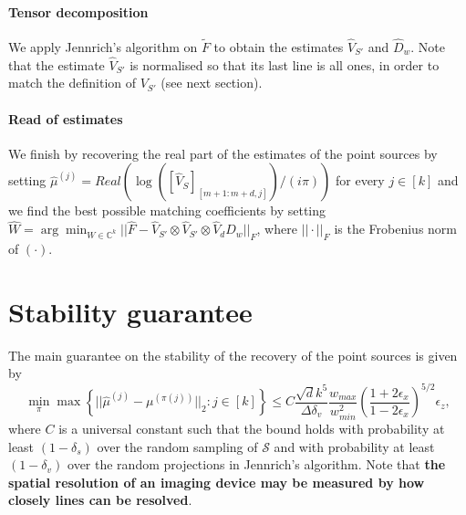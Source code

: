 \paragraph{Tensor decomposition} We apply Jennrich's algorithm on $\tilde{F}$ to obtain the estimates $\widehat{V}_{S'}$ and $\widehat{D}_w$. Note that the estimate $\widehat{V}_{S'}$ is normalised so that its last line is all ones, in order to match the definition of $V_{S'}$ (see next section).
\paragraph{Read of estimates} We finish by recovering the real part of the estimates of the point sources by setting $\widehat{\mu}^{(j)}=Real(\log([\widehat{V}_S]_{[m+1:m+d,j]})/(i\pi))$ for every $j\in[k]$ and we find the best possible matching coefficients by setting $\widehat{W}=\arg\min_{W\in\mathbb{C}^k}||\widehat{F}-\widehat{V}_{S'}\otimes\widehat{V}_{S'}\otimes \widehat{V}_dD_w||_F$, where $||\cdot||_F$ is the Frobenius norm of $(\cdot)$.

\section{Stability guarantee}
The main guarantee on the stability of the recovery of the point sources is given by $$\min_\pi\max\left\{||\widehat{\mu}^{(j)}-\mu^{(\pi(j))}||_2:j\in[k]\right\}\leq C\frac{\sqrt{d}k^5}{\Delta\delta_v}\frac{w_{max}}{w_{min}^2}\left(\frac{1+2\epsilon_x}{1-2\epsilon_x}\right)^{5/2}\epsilon_z,$$ where $C$ is a universal constant such that the bound holds with probability at least $(1-\delta_s)$ over the random sampling of $\mathcal{S}$ and with probability at least $(1-\delta_v)$ over the random projections in Jennrich's algorithm. Note that {\bf the spatial resolution of an imaging device may be measured by how closely lines can be resolved}.

